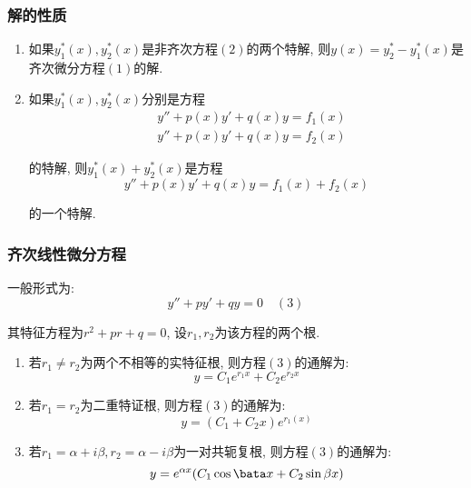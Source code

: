 \subsubsection{解的性质}
\begin{enumerate}
\item 如果$ y_{1}^{*}(x), y_{2}^{*}(x) $是非齐次方程$ (2) $的两个特解, 则$ y(x)=y_{2}^{*}-y_{1}^{*}(x) $是齐次微分方程$ (1) $的解.
\item 如果$ y_{1}^{*}(x),y_{2}^{*}(x) $分别是方程
\begin{equation*}
\begin{aligned}
& y''+p(x)y'+q(x)y=f_{1}(x) \\
& y''+p(x)y'+q(x)y=f_{2}(x)
\end{aligned}
\end{equation*}\par
的特解, 则$ y_{1}^{*}(x)+y_{2}^{*}(x) $是方程
\begin{equation*}
y''+p(x)y'+q(x)y=f_{1}(x)+f_{2}(x)
\end{equation*}\par
的一个特解.
\end{enumerate}
\subsubsection{齐次线性微分方程}
一般形式为:
\begin{equation*}
y''+py'+qy=0 \quad (3)
\end{equation*}\par
其特征方程为$ r^{2}+pr+q=0 $, 设$ r_{1}, r_{2} $为该方程的两个根.
\begin{enumerate}
\item 若$ r_{1}\neq r_{2} $为两个不相等的实特征根, 则方程$ (3) $的通解为:
\begin{equation*}
y=C_{1}e^{r_{1}x}+C_{2}e^{r_{2}x}
\end{equation*}
\item 若$ r_{1}=r_{2} $为二重特证根, 则方程$ (3) $的通解为:
\begin{equation*}
y=(C_{1}+C_{2}x)e^{r_{1}(x)}
\end{equation*}
\item 若$ r_{1}=\alpha+i\beta, r_{2}=\alpha-i\beta $为一对共轭复根, 则方程$ (3) $的通解为:
\begin{equation*}
y=e^{\alpha x}(C_{1}\cos \bata x+C_{2}\sin \beta x)
\end{equation*}
\end{enumerate}
